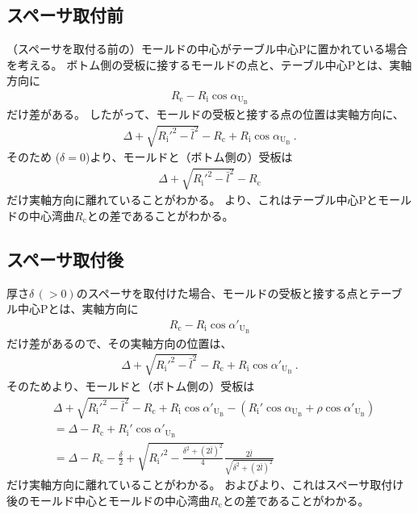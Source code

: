 \subsection{スペーサ取付前}
（スペーサを取付る前の）モールドの中心がテーブル中心Pに置かれている場合を考える。
ボトム側の受板に接するモールドの点と、テーブル中心Pとは、実軸方向に
\begin{align*}
  R_\mathrm c-R_\mathrm i\cos\alpha_{\mathrm U_\mathrm B}
\end{align*}
だけ差がある。
したがって、モールドの受板と接する点の位置は実軸方向に、
\begin{align*}
  \varDelta+\sqrt{R_\mathrm i'^2-\bar l^2}-R_\mathrm c+R_\mathrm i\cos\alpha_{\mathrm U_\mathrm B}\ .
\end{align*}
そのため ($\delta = 0$)より、モールドと（ボトム側の）受板は
\begin{align*}
  \varDelta+\sqrt{R_\mathrm i'^2-\bar l^2}-R_\mathrm c
\end{align*}
だけ実軸方向に離れていることがわかる。
より、これはテーブル中心Pとモールドの中心湾曲$R_\mathrm c$との差であることがわかる。



\subsection{スペーサ取付後}
厚さ$\delta\,(>0)$のスペーサを取付けた場合、モールドの受板と接する点とテーブル中心Pとは、実軸方向に
\begin{align*}
  R_\mathrm c-R_\mathrm i\cos\alpha'_{\mathrm U_\mathrm B}
\end{align*}
だけ差があるので、その実軸方向の位置は、
\begin{align*}
  \varDelta+\sqrt{R_\mathrm i'^2-\bar l^2}-R_\mathrm c+R_\mathrm i\cos\alpha'_{\mathrm U_\mathrm B}\ .
\end{align*}
そのためより、モールドと（ボトム側の）受板は
\begin{align*}
  &  \varDelta+\sqrt{R_\mathrm i'^2-\bar l^2}-R_\mathrm c+R_\mathrm i\cos\alpha'_{\mathrm U_\mathrm B}
     -\left(R_\mathrm i'\cos\alpha_{\mathrm U_\mathrm B}+\rho\cos\alpha'_{\mathrm U_\mathrm B}\right)\\
  &= \varDelta-R_\mathrm c+R_\mathrm i'\cos\alpha'_{\mathrm U_\mathrm B}\\
  &= \varDelta-R_\mathrm c
     -\frac\delta2+\sqrt{R_\mathrm i'^2-\frac{\delta^2+(2\bar l)^2}4}\frac{2\bar l}{\sqrt{\delta^2+(2\bar l)^2}}
\end{align*}
だけ実軸方向に離れていることがわかる。
およびより、これはスペーサ取付け後のモールド中心とモールドの中心湾曲$R_\mathrm c$との差であることがわかる。

